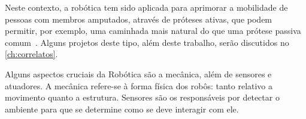 Neste contexto, a robótica tem sido aplicada para aprimorar a mobilidade de pessoas com membros amputados, através de próteses ativas, que podem permitir, por exemplo, uma caminhada mais natural do que uma prótese passiva comum~\cite{dedic:2011}. Alguns projetos deste tipo, além deste trabalho, serão discutidos no \autoref{ch:correlatos}.

Alguns aspectos cruciais da Robótica são a mecânica, além de sensores e atuadores. A mecânica refere-se à forma física dos robôs: tanto relativo a movimento quanto a estrutura. Sensores são os responsáveis por detectar o ambiente para que se determine como se deve interagir com ele.







